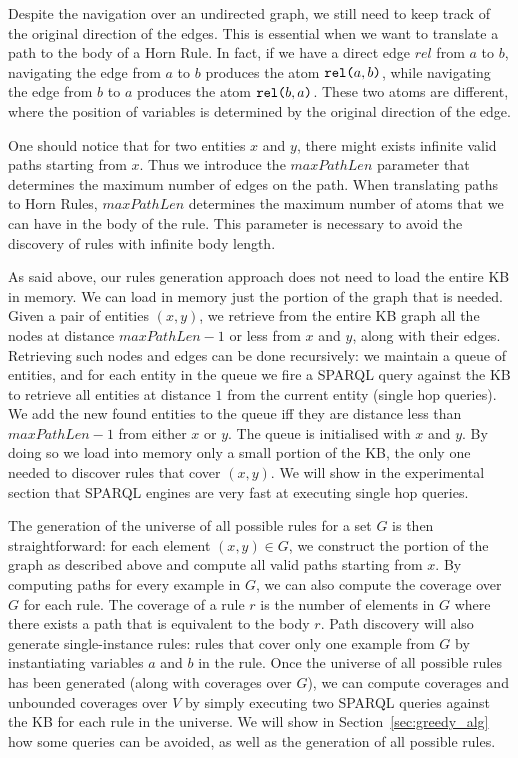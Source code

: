 Despite the navigation over an undirected graph, we still need to keep track of the original direction of the edges. This is essential when we want to translate a path to the body of a Horn Rule. In fact, if we have a direct edge $rel$ from $a$ to $b$, navigating the edge from $a$ to $b$ produces the atom $\texttt{rel(}a,b\texttt{)}$, while navigating the edge from $b$ to $a$ produces the atom $\texttt{rel(}b,a\texttt{)}$. These two atoms are different, where the position of variables is determined by the original direction of the edge.

One should notice that for two entities $x$ and $y$, there might exists infinite valid paths starting from $x$. Thus we introduce the $maxPathLen$ parameter that determines the maximum number of edges on the path. When translating paths to Horn Rules, $maxPathLen$ determines the maximum number of atoms that we can have in the body of the rule. This parameter is necessary to avoid the discovery of rules with infinite body length.

As said above, our rules generation approach does not need to load the entire KB in memory. We can load in memory just the portion of the graph that is needed. Given a pair of entities $(x,y)$, we retrieve from the entire KB graph all the nodes at distance $maxPathLen-1$ or less from $x$ and $y$, along with their edges. Retrieving such nodes and edges can be done recursively: we maintain a queue of entities, and for each entity in the queue we fire a SPARQL query against the KB to retrieve all entities at distance $1$ from the current entity (single hop queries). We add the new found entities to the queue iff they are distance less than  $maxPathLen-1$ from either $x$ or $y$. The queue is initialised with $x$ and $y$. By doing so we load into memory only a small portion of the KB, the only one needed to discover rules that cover $(x,y)$. We will show in the experimental section that SPARQL engines are very fast at executing single hop queries.

The generation of the universe of all possible rules for a set $G$ is then straightforward: for each element $(x,y) \in G$, we construct the portion of the graph as described above and compute all valid paths starting from $x$. By computing paths for every example in $G$, we can also compute the coverage over $G$ for each rule. The coverage of a rule $r$ is the number of elements in $G$ where there exists a path that is equivalent to the body $r$. Path discovery will also generate single-instance rules: rules that cover only one example from $G$ by instantiating variables $a$ and $b$ in the rule. Once the universe of all possible rules has been generated (along with coverages over $G$), we can compute coverages and unbounded coverages over $V$ by simply executing two SPARQL queries against the KB for each rule in the universe. We will show in Section~\ref{sec:greedy_alg} how some queries can be avoided, as well as the generation of all possible rules.



